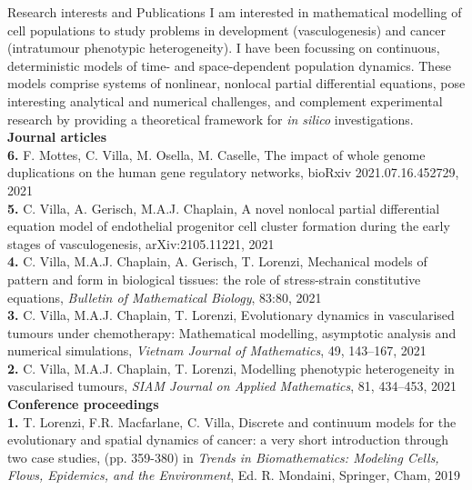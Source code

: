 \documentclass{resume} %
\begin{document}
\begin{rSection}{Research interests and Publications}
I am interested in mathematical modelling of cell populations to study problems in development (vasculogenesis) and cancer (intratumour phenotypic heterogeneity). I have been focussing on continuous, deterministic models of time- and space-dependent population dynamics. These models comprise systems of nonlinear, nonlocal partial differential equations, pose interesting analytical and numerical challenges, and  complement experimental research by providing a theoretical framework for \textit{in silico} investigations. \\
{\bf Journal articles}\\
{\bf 6.} F. Mottes, C. Villa, M. Osella, M. Caselle, The impact of whole genome duplications on the human gene regulatory networks, bioRxiv 2021.07.16.452729, 2021 \\
{\bf 5.} {C. Villa}, A. Gerisch, M.A.J. Chaplain, A novel nonlocal partial differential equation model of endothelial progenitor cell cluster formation during the early stages of vasculogenesis, arXiv:2105.11221,  2021\\
{\bf 4.} {C. Villa}, M.A.J. Chaplain, A. Gerisch, T. Lorenzi, {Mechanical models of pattern and form in biological tissues: the role of stress-strain constitutive equations}, {\em Bulletin of Mathematical Biology}, 83:80, 2021 \\
{\bf 3.} {C. Villa}, M.A.J. Chaplain, T. Lorenzi, {Evolutionary dynamics in vascularised tumours under chemotherapy: Mathematical modelling, asymptotic analysis and numerical simulations}, {\em Vietnam Journal of Mathematics}, 49, 143–167, 2021 \\
{\bf 2.} {C. Villa}, M.A.J. Chaplain, T. Lorenzi, {Modelling phenotypic heterogeneity in vascularised tumours}, {\em SIAM Journal on Applied Mathematics}, 81, 434–453, 2021 \\
{\bf Conference proceedings}\\
{\bf 1.} T. Lorenzi, F.R. Macfarlane, {C. Villa}, {Discrete and continuum models for the evolutionary and spatial dynamics of cancer: a very short introduction through two case studies}, (pp. 359-380) in {\em Trends in Biomathematics: Modeling Cells, Flows, Epidemics, and the Environment}, Ed. R. Mondaini, Springer, Cham, 2019
\end{rSection}
\end{document}
